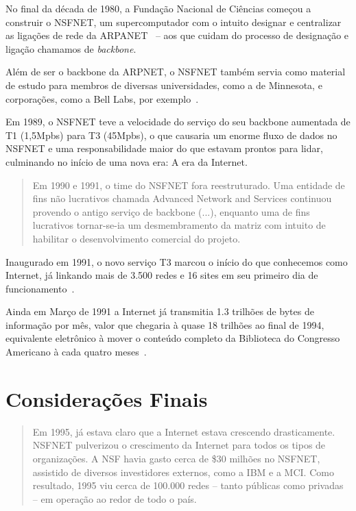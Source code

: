 \documentclass[conference]{IEEEtran}
\begin{document}
  No final da década de 1980, a Fundação Nacional de Ciências começou a
  construir o NSFNET, um supercomputador com o intuito designar e centralizar as
  ligações de rede da ARPANET~\cite{nsfnet} -- aos que cuidam do processo de designação e
  ligação chamamos de \emph{backbone}.

  Além de ser o backbone da ARPNET, o NSFNET também servia como material de
  estudo para membros de diversas universidades, como a de Minnesota, e
  corporações, como a Bell Labs, por exemplo~\cite{nsfnet}.

  Em 1989, o NSFNET teve a velocidade do serviço do seu backbone aumentada de T1
  (1,5Mpbs) para T3 (45Mpbs), o que causaria um enorme fluxo de dados no NSFNET
  e uma responsabilidade maior do que estavam prontos para lidar, culminando no
  início de uma nova era: A era da Internet.

  \begin{quote}

    Em 1990 e 1991, o time do NSFNET fora reestruturado. Uma entidade de
    fins não lucrativos chamada Advanced Network and Services continuou provendo
    o antigo serviço de backbone (...), enquanto uma de fins lucrativos
    tornar-se-ia um desmembramento da matriz com intuito de habilitar o
    desenvolvimento comercial do projeto.~\cite{nsfnet}

  \end{quote}

  Inaugurado em 1991, o novo serviço T3 marcou o início do que conhecemos como
  Internet, já linkando mais de 3.500 redes e 16 sites em seu primeiro dia de
  funcionamento~\cite{nsfnet}.

  Ainda em Março de 1991 a Internet já transmitia 1.3 trilhões de bytes de
  informação por mês, valor que chegaria à quase 18 trilhões ao final de 1994,
  equivalente eletrônico à mover o conteúdo completo da Biblioteca do Congresso
  Americano à cada quatro meses~\cite{nsfnet}.

\section{Considerações Finais}

  \begin{quote}

    Em 1995, já estava claro que a Internet estava crescendo drasticamente.
    NSFNET pulverizou o crescimento da Internet para todos os tipos de
    organizações. A NSF havia gasto cerca de \$30 milhões no NSFNET, assistido
    de diversos investidores externos, como a IBM e a MCI. Como resultado, 1995
    viu cerca de 100.000 redes -- tanto públicas como privadas -- em operação ao
    redor de todo o país.~\cite{nsfnet}
    
  \end{quote}
\end{document}
